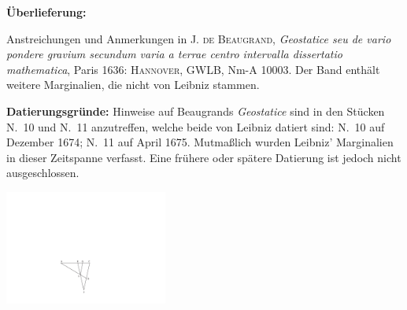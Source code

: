 \begin{ledgroupsized}[r]{120mm}
\footnotesize 
\pstart 
\noindent\textbf{\"{U}berlieferung:}
\pend
\end{ledgroupsized}
\begin{ledgroupsized}[r]{114mm}
\footnotesize 
\pstart \parindent -6mm
%
Anstreichungen und Anmerkungen in \textsc{J. de Beaugrand},\protect{}\cite{00334} \textit{Geostatice seu de vario pondere gravium secundum varia a terrae centro intervalla dissertatio mathematica}, Paris 1636: \textsc{Hannover}, GWLB,
Nm-A 10003. Der Band enth\"{a}lt weitere Marginalien, die nicht von Leibniz stammen.\pend
\end{ledgroupsized}

\vspace*{5mm}
\begin{ledgroup}
\footnotesize 
\pstart
\noindent\footnotesize{\textbf{Datierungsgr\"{u}nde:}
Hinweise auf Beaugrands \textit{Geostatice} sind in den Stücken N.~10
und N.~11
anzutreffen, welche beide von Leibniz datiert sind: N.~10 auf Dezember 1674; N.~11 auf April 1675.
Mutmaßlich wurden Leibniz' Marginalien in dieser Zeitspanne verfasst.
Eine frühere oder spätere Datierung ist jedoch nicht ausgeschlossen.}
\pend
\end{ledgroup}
\count{}
\vspace*{8mm}
\pstart 
\normalsize
\noindent[p. 4] 
\pend
\vspace{1.5em}
\begin{center}
\includegraphics[width=0.4\textwidth]{images/beaugrand1636-d1.pdf}\\
 \noindent {}
\end{center} 
